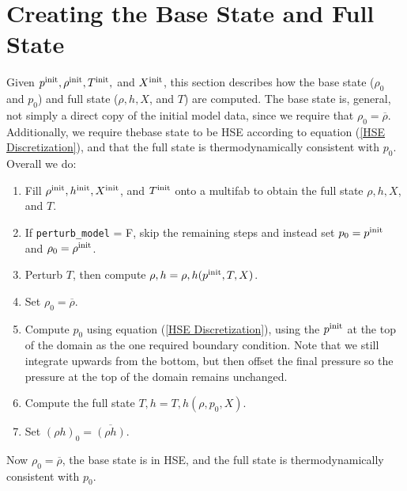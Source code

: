 \section{Creating the Base State and Full State}\label{Sec:Creating the Base State and Full State}

Given $p^{\rm init}, \rho^{\rm init}, T^{\rm init},$ and $X^{\rm init}$, this
section describes how the base state ($\rho_0$ and $p_0$) and full
state ($\rho, h, X$, and $T$) are computed.  The base state is, general, not
simply a direct copy of the initial model data, since we require that
$\rho_0 = \overline\rho$.  Additionally, we require thebase state to
be HSE according to equation (\ref{HSE Discretization}), and that the full
state is thermodynamically consistent with $p_0$.  Overall we do:
\begin{enumerate}
\item Fill $\rho^{\rm init}, h^{\rm init}, X^{\rm init}$, and $T^{\rm init}$ onto a 
  multifab to obtain the full state $\rho, h, X$, and $T$.
\item If {\tt perturb\_model} = F, skip the remaining steps and
  instead set $p_0 = p^{\rm init}$ and $\rho_0 = \rho^{\rm init}$.
\item Perturb $T$, then compute $\rho,h = \rho,h(p^{\rm init},T,X)$.
\item Set $\rho_0 = \overline\rho$.
\item Compute $p_0$ using equation (\ref{HSE Discretization}), using
  the $p^{\rm init}$ at the top of the domain as the one required boundary 
  condition.  Note that we still integrate upwards from the bottom, but then
  offset the final pressure so the pressure at the top of the domain
  remains unchanged.
\item Compute the full state $T,h = T,h(\rho,p_0,X)$.
\item Set $(\rho h)_0 = \overline{(\rho h)}$.
\end{enumerate}
Now $\rho_0 = \overline\rho$, the base state is in HSE, and the full
state is thermodynamically consistent with $p_0$.

